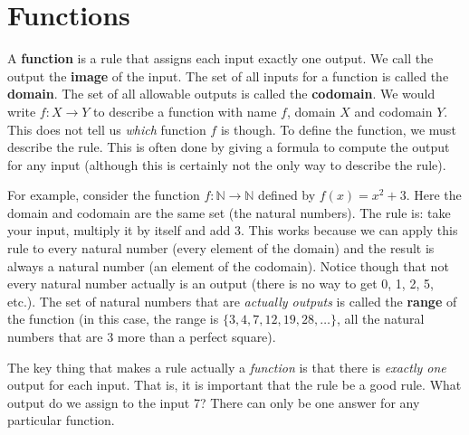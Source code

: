 \documentclass[10pt,]{book}
\newcommand{\terminology}[1]{\textbf{#1}}
\theoremstyle{plain}
\theoremstyle{definition}
\theoremstyle{definition}
\theoremstyle{definition}
\numberwithin{equation}{section}
\def\N{\mathbb N}
\begin{document}
\section[Functions]{Functions}\label{sec_intro-functions}
\typeout{************************************************}
\typeout{************************************************}

      A
      \terminology{function} is a rule that assigns each input exactly one output.  We call the output the \terminology{image} of the input.  The set of all inputs for a function is called the
      \terminology{domain}. The set of all allowable outputs is called the
      \terminology{codomain}. We would write \(f:X \to Y\) to describe a function with name \(f\), domain \(X\) and codomain \(Y\). This does not tell us \emph{which} function \(f\) is though. To define the function, we must describe the rule. This is often done by giving a formula to compute the output for any input (although this is certainly not the only way to describe the rule). %
\par
 For example, consider the function \(f:\N \to \N\) defined by \(f(x) = x^2 + 3\). Here the domain and codomain are the same set (the natural numbers). The rule is: take your input, multiply it by itself and add 3. This works because we can apply this rule to every natural number (every element of the domain) and the result is always a natural number (an element of the codomain). Notice though that not every natural number actually is an output (there is no way to get 0, 1, 2, 5, etc.). The set of natural numbers that are \emph{actually outputs} is called the
      \terminology{range} of the function (in this case, the range is \(\{3, 4, 7, 12, 19, 28, \ldots\}\), all the natural numbers that are 3 more than a perfect square).
\par

      The key thing that makes a rule actually a \emph{function} is that there is \emph{exactly one} output for each input. That is, it is important that the rule be a good rule. What output do we assign to the input 7? There can only be one answer for any particular function.
\par
\end{document}
